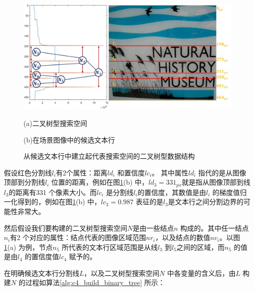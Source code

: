     \begin{figure}[!h]
    \centering
    \includegraphics[width=\textwidth]{./figures/c4_binary_tree_construction.jpg}
    \begin{minipage}[t]{0.40\linewidth}
    \centerline{\small (a)二叉树型搜索空间}
    \end{minipage}
    \begin{minipage}[t]{0.51\linewidth}
    \centerline{\small(b)在场景图像中的候选文本行}
    \end{minipage}
    \caption{从候选文本行中建立起代表搜索空间的二叉树型数据结构}
    \label{fig.c4_binary_tree_construction}
    \end{figure}

    假设红色分割线$l_i$有2个属性：距离$ld_i$ 和置信度$lc_i$。 其中属性$ld_i$ 指代的是从图像顶部到分割线$l_i$ 位置的距离，例如在图\ref{fig.c4_binary_tree_construction}(b) 中，$ld_3=331_{px}$就是指从图像顶部到线$l_3$的距离有331 个像素大小。而$lc_i$ 是分割线$l_i$的置信度，其数值是由$l_i$ 的梯度值归一化得到的，例如在图\ref{fig.c4_binary_tree_construction}(b) 中，$lc_3=0.987$ 表征的是$l_3$是文本行之间分割边界的可能性非常大。

    然后假设我们要构建的二叉树型搜索空间$N$是由一些结点$n$ 构成的。其中任一结点$n_i$有2 个对应的属性：结点代表的图像区域范围$nr_i$，以及结点的数值$nv_i$。以图\ref{fig.c4_binary_tree_construction}(a) 为例，节点$n_5$ 所代表的文本行区域范围是从线$l_3$ 到$l_5$之间的区域，而$n_5$ 的值是由$l_4$ 的置信度值$lc_4$ 赋予的。

    在明确候选文本行分割线$L$，以及二叉树型搜索空间$N$ 中各变量的含义后，由$L$ 构建$N$ 的过程如算法\ref{alg:c4_build_binary_tree} 所示：

